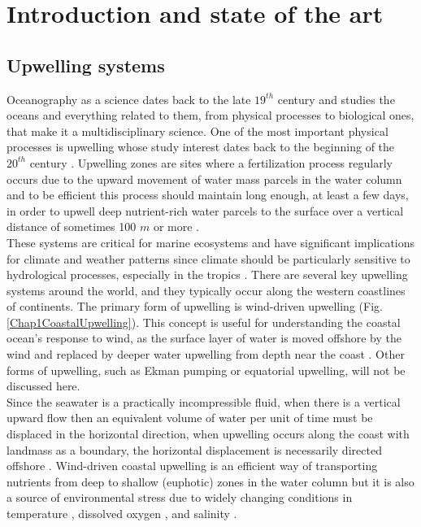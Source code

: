 \chapter{Introduction and state of the art}\label{Chap1}

\clearpage
\section{Upwelling systems}\label{Chap1UpweSyst}

Oceanography as a science dates back to the late $19^{th}$ century \citep{Wust1964,Mill2012,LlopCowe2014} and studies the oceans and everything related to them, from physical processes to biological ones, that make it a multidisciplinary science. One of the most important physical processes is upwelling whose study interest dates back to the beginning of the $20^{th}$ century \citep{Ogil1912,Murp1920}. Upwelling zones are sites where a fertilization process regularly occurs due to the upward movement of water mass parcels in the water column and to be efficient this process should maintain long enough, at least a few days, in order to upwell deep nutrient-rich water parcels to the surface over a vertical distance of sometimes 100 $m$ or more \citep{Marg1978}.\\

These systems are critical for marine ecosystems and have significant implications for climate and weather patterns since climate should be particularly sensitive to hydrological processes, especially in the tropics \citep{Webs1994}. There are several key upwelling systems around the world, and they typically occur along the western coastlines of continents. The primary form of upwelling is wind-driven upwelling (Fig. \ref{Chap1CoastalUpwelling}). This concept is useful for understanding the coastal ocean's response to wind, as the surface layer of water is moved offshore by the wind and replaced by deeper water upwelling from depth near the coast \citep{BrinHalp1983}. Other forms of upwelling, such as Ekman pumping or equatorial upwelling, will not be discussed here.\\

Since the seawater is a practically incompressible fluid, when there is a vertical upward flow then an equivalent volume of water per unit of time must be displaced in the horizontal direction, when upwelling occurs along the coast with landmass as a boundary, the horizontal displacement is necessarily directed offshore \citep{KampCap2}. Wind-driven coastal upwelling is an efficient way of transporting nutrients from deep to shallow (euphotic) zones in the water column \citep{MessChav2015,MessChav2017} but it is also a source of environmental stress due to widely changing conditions in temperature \citep{CastWang2014}, dissolved oxygen \citep{Scul2010}, and salinity \citep{XuanHuan2012}.\\

